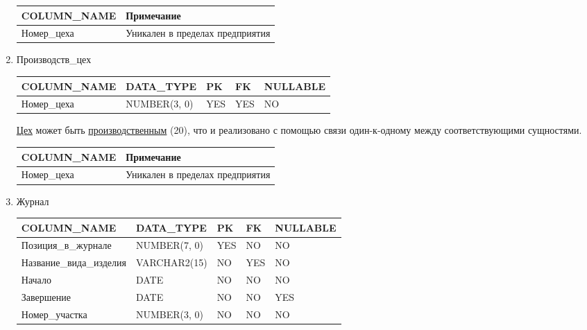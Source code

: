 \begin{enumerate}
    \begin{tabular}{|p{4cm}|p{5cm}|} \hline

        {\bf COLUMN\_NAME} & {\bf Примечание} \\ \hline
        Номер\_цеха & Уникален в пределах предприятия \\ \hline

    \end{tabular}

    \item{Производств\_цех}

    \begin{tabular}{|p{4cm}|p{3cm}|p{1cm}|p{1cm}|p{2cm}|} \hline

        {\bf COLUMN\_NAME} & {\bf DATA\_TYPE} & {\bf PK} & {\bf FK} & {\bf NULLABLE} \\ \hline
        Номер\_цеха & NUMBER(3, 0) & YES & YES & NO \\ \hline

    \end{tabular}

   \underline{Цех} может быть \underline{производственным} (20), что и реализовано с помощью связи один-к-одному между соответствующими сущностями.

    \begin{tabular}{|p{4cm}|p{5cm}|} \hline

        {\bf COLUMN\_NAME} & {\bf Примечание} \\ \hline
        Номер\_цеха & Уникален в пределах предприятия \\ \hline

    \end{tabular}

    \item{Журнал}

    \begin{tabular}{|p{4cm}|p{3cm}|p{1cm}|p{1cm}|p{2cm}|} \hline

        {\bf COLUMN\_NAME} & {\bf DATA\_TYPE} & {\bf PK} & {\bf FK} & {\bf NULLABLE} \\ \hline
        Позиция\_в\_журнале & NUMBER(7, 0) & YES & NO & NO \\ \hline
        Название\_вида\_изделия & VARCHAR2(15) & NO & YES & NO \\ \hline
        Начало & DATE & NO & NO & NO \\ \hline
        Завершение & DATE & NO & NO & YES \\ \hline
        Номер\_участка & NUMBER(3, 0) & NO & NO & NO \\ \hline


\end{tabular}
\end{enumerate}
